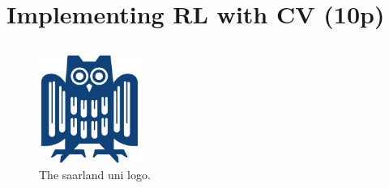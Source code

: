 \section{Implementing RL with CV (10p)}

\subsection{}

\begin{figure}[H]
\centering
\includegraphics[width=0.3\textwidth]{eule.png}
\caption{The saarland uni logo.}
\label{fig:logo}
\end{figure}
